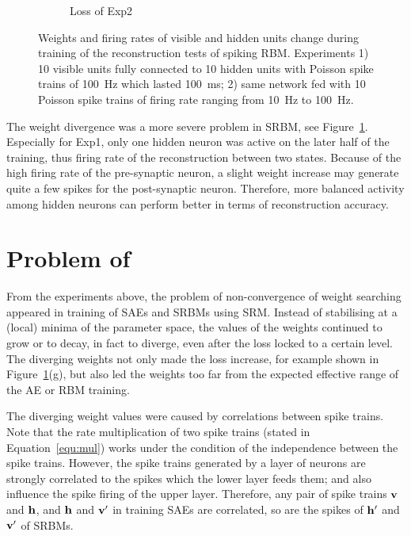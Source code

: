 \begin{figure}
\begin{subfigure}[t]{0.45\textwidth}
		\caption{Loss of Exp2}
	\end{subfigure}
	\caption{Weights and firing rates of visible and hidden units change during training of the reconstruction tests of \DIFaddbeginFL {}\DIFaddendFL spiking RBM. 
		Experiments 1) 10 visible units fully connected to 10 hidden units with Poisson spike trains of 100~Hz which lasted 100~ms; 2) \DIFaddbeginFL {}\DIFaddendFL same network fed with 10 Poisson spike trains of firing rate ranging from 10~Hz to 100~Hz.}
\label{fig:srbm_orig}
\end{figure}

The weight divergence was a more severe problem in \DIFaddbegin {}\DIFaddend SRBM, see Figure~\ref{fig:srbm_orig}.
Especially for Exp1, only one hidden neuron was active on the later half of the training, thus \DIFdelbegin {}\DIFdelend \DIFaddbegin {}\DIFaddend firing rate of the reconstruction \DIFdelbegin {}\DIFdelend \DIFaddbegin {}\DIFaddend between two states.
Because of the high firing rate of the pre-synaptic neuron, a slight weight increase may generate quite a few spikes for the post-synaptic neuron.
Therefore, more balanced activity among hidden neurons can perform better in terms of reconstruction accuracy.

\section{Problem of \DIFdelbegin {}\DIFdelend \DIFaddbegin {}\DIFaddend }
\label{sec:problem}
From the experiments above, the problem of non-convergence of weight searching appeared in training of SAEs and SRBMs using SRM.
Instead of stabilising at a (local) minima of the parameter space, the values of the weights continued to grow or to decay, in fact to diverge, even after the loss locked to a certain level.
The diverging weights not only made the loss increase, for example \DIFaddbegin {}\DIFaddend shown in Figure~\ref{fig:srbm_orig}(g), but also led the weights too far from the expected effective range of the AE or RBM training.

The diverging weight values were caused by \DIFdelbegin {}\DIFdelend correlations between spike trains.
Note that the rate multiplication of two spike trains (stated in Equation~\ref{equ:mul}) works under the condition of the independence between the spike trains.
However, the spike trains generated by a layer of neurons are strongly correlated to the spikes which the lower layer feeds them; and also influence the spike firing of the upper layer.
Therefore, any pair of spike trains $\bf{v}$ and $\bf{h}$, and $\bf{h}$ and $\bf{v'}$ in training SAEs are correlated, so are the spikes of $\bf{h'}$ and $\bf{v'}$ of SRBMs.


